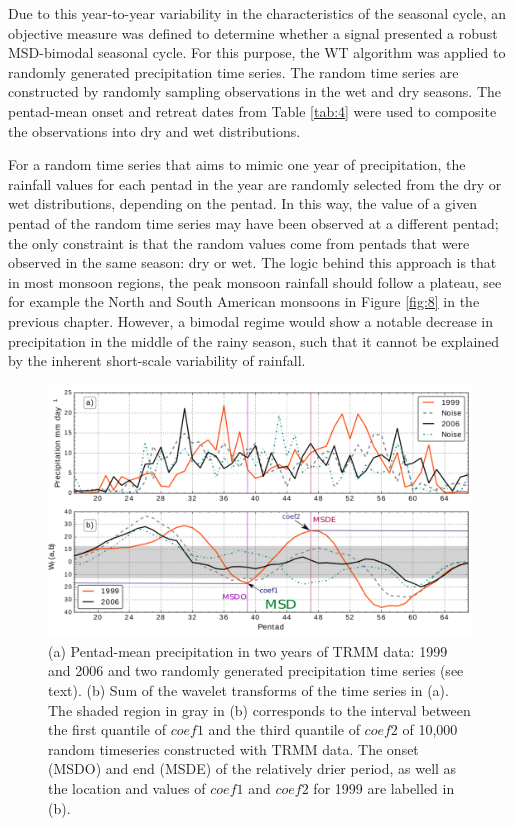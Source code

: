 Due to this year-to-year variability in the characteristics of the seasonal cycle, an objective measure was defined to determine whether a signal presented a robust MSD-bimodal seasonal cycle.  
For this purpose, the WT algorithm was applied to randomly generated precipitation time series.
 The random time series are constructed by randomly sampling observations in the wet and dry seasons. 
 The pentad-mean onset and retreat dates from Table \ref{tab:4} were used to composite the observations into dry and wet distributions. 
 
 
 For a random time series that aims to mimic one year of precipitation, the rainfall values for each pentad in the year are randomly selected from the dry or wet distributions, depending on the pentad. In this way, the value of a given pentad of the random time series may have been observed at a different pentad; the only constraint is that the random values come from pentads that were observed in the same season: dry or wet. The logic behind this approach is that in most monsoon regions, the peak monsoon rainfall should follow a plateau, see for example the North and South American monsoons in Figure \ref{fig:8} in the previous chapter. However, a bimodal regime would show a notable decrease in precipitation in the middle of the rainy season, such that it cannot be explained by the inherent short-scale variability of rainfall. 
 
\begin{figure}[t!]
\centering
\includegraphics[width=\linewidth]{figures/wav_S1.pdf}
\caption[Determination of MSD timings and coefficients]{(a) Pentad-mean precipitation in two years of TRMM data: 1999 and 2006 and two randomly generated precipitation time series (see text). (b) Sum of the wavelet transforms of the time series in (a). The shaded region in gray in (b) corresponds to the interval between the first quantile of $coef1$ and the third quantile of $coef2$ of 10,000 random timeseries constructed with TRMM data. The onset (MSDO) and end (MSDE) of the relatively drier period, as well as the location and values of $coef1$ and $coef2$ for 1999 are labelled in (b). }
\label{fig:S1}
\end{figure}
 
